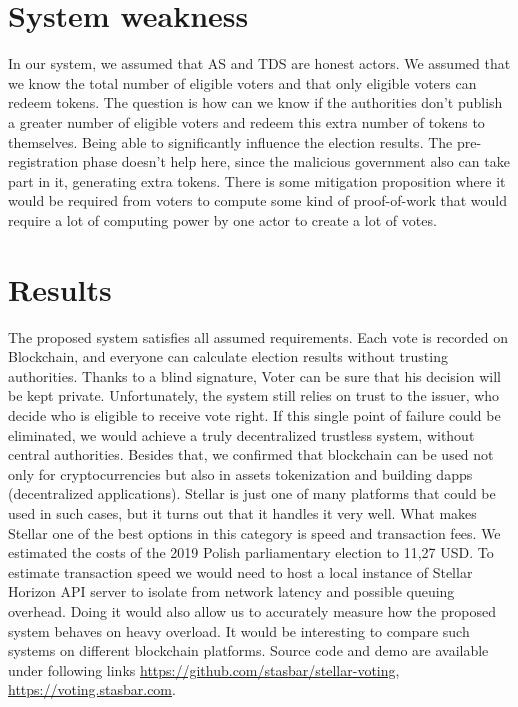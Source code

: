 \documentclass[runningheads]{llncs}
\begin{document}
\section{System weakness}
In our system, we assumed that AS and TDS are honest actors. We assumed that we know the total number of eligible voters and that only eligible voters can redeem tokens. The question is how can we know if the authorities don't publish a greater number of eligible voters and redeem this extra number of tokens to themselves. Being able to significantly influence the election results. The pre-registration phase doesn't help here, since the malicious government also can take part in it, generating extra tokens. There is some mitigation proposition where it would be required from voters to compute some kind of proof-of-work that would require a lot of computing power by one actor to create a lot of votes.

\section{Results}
The proposed system satisfies all assumed requirements. Each vote is recorded on Blockchain, and everyone can calculate election results without trusting authorities. Thanks to a blind signature, Voter can be sure that his decision will be kept private. Unfortunately, the system still relies on trust to the issuer, who decide who is eligible to receive vote right. If this single point of failure could be eliminated, we would achieve a truly decentralized trustless system, without central authorities.
Besides that, we confirmed that blockchain can be used not only for cryptocurrencies but also in assets tokenization and building dapps (decentralized applications). Stellar is just one of many platforms that could be used in such cases, but it turns out that it handles it very well. What makes Stellar one of the best options in this category is speed and transaction fees. We estimated the costs of the 2019 Polish parliamentary election to 11,27 USD. To estimate transaction speed we would need to host a local instance of Stellar Horizon API server to isolate from network latency and possible queuing overhead. Doing it would also allow us to accurately measure how the proposed system behaves on heavy overload. It would be interesting to compare such systems on different blockchain platforms. Source code and demo are available under following links \url{https://github.com/stasbar/stellar-voting}, \url{https://voting.stasbar.com}.




\end{document}
